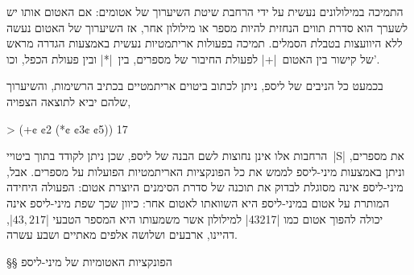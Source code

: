 התמיכה במילולונים נעשית על ידי הרחבת שיטת השיערוך של אטומים: אם האטום אותו יש
לשערך הוא סדרת תווים הנחזית להיות מספר או מילולון אחר, אז השיערוך של האטום נעשה
ללא היוועצות בטבלת הסמלים. תמיכה בפעולות אריתמטיות נעשית באמצעות הגדרה מראש של
קישור בין האטום~\T|+| לפעולת החיבור של מספרים, בין~\T|*| ובין פעולת הכפל,
וכו'.

בכמעט כל הניבים של ליספ, ניתן לכתוב ביטוים אריתמטיים בכתיב הרשימות, והשיערוך
שלהם יביא לתוצאה הצפויה,

\begin{SAMPLE}
> (+¢ ¢2 (*¢ ¢3¢ ¢5))
17
\end{SAMPLE}

הרחבות אלו אינן נחוצות לשם הבנה של ליספ, שכן ניתן לקודד בתוך ביטויי~\E|S| את
מספרים, וניתן באמצעות מיני-ליספ לממש את כל הפונקציות האריתמטיות הפועלות על
מספרים. אבל, מיני-ליספ אינה מסוגלת לבדוק את תוכנה של סדרת הסימנים היוצרת אטום:
הפעולה היחידה המותרת על אטום במיני-ליספ היא השוואתו לאטום אחר: כיוון שכך שפת
מיני-ליספ אינה יכולה להפוך אטום כמו \T|43217| למילולון אשר משמעותו היא המספר
הטבעי \E|$43,217$|, דהיינו, ארבעים ושלושה אלפים מאתיים ושבע עשרה.

§§ הפונקציות האטומיות של מיני-ליספ 

